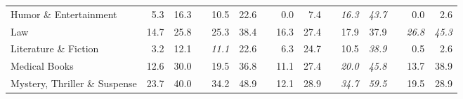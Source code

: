 \documentclass[12pt]{article}
\numberwithin{equation}{section}
\numberwithin{figure}{section}
\begin{document}
\begin{table}[]
{\begin{tabular}{lrrrrrrrrrrrrrr}
	Humor \& Entertainment         & 5.3                                & 16.3                               &                               & 10.5                               & 22.6                               &                               & 0.0                                & 7.4                                &                               & \textit{16.3}                      & \textit{43.7}                      &                               & 0.0                                & 2.6                                \\
	Law                            & 14.7                               & 25.8                               &                               & 25.3                               & 38.4                               &                               & 16.3                               & 27.4                               &                               & 17.9                               & 37.9                               &                               & \textit{26.8}                      & \textit{45.3}                      \\
	Literature \& Fiction          & 3.2                                & 12.1                               &                               & \textit{11.1}                      & 22.6                               &                               & 6.3                                & 24.7                               &                               & 10.5                               & \textit{38.9}                      &                               & 0.5                                & 2.6                                \\
	Medical Books                  & 12.6                               & 30.0                               &                               & 19.5                               & 36.8                               &                               & 11.1                               & 27.4                               &                               & \textit{20.0}                      & \textit{45.8}                      &                               & 13.7                               & 38.9                               \\
	Mystery, Thriller \& Suspense  & 23.7                               & 40.0                               &                               & 34.2                               & 48.9                               &                               & 12.1                               & 28.9                               &                               & \textit{34.7}                      & \textit{59.5}                      &                               & 19.5                               & 28.9                               \\

\end{tabular}}
\end{table}
\end{document}
